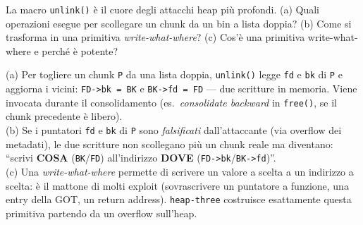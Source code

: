 \question[6]
La macro \lstinline|unlink()| è il cuore degli attacchi heap più profondi. (a) Quali operazioni esegue per scollegare un chunk da un bin a lista doppia? (b) Come si trasforma in una primitiva \emph{write-what-where}? (c) Cos'è una primitiva write-what-where e perché è potente?
\begin{solution}
(a) Per togliere un chunk \lstinline|P| da una lista doppia, \lstinline|unlink()| legge \lstinline|fd| e \lstinline|bk| di \lstinline|P| e aggiorna i vicini: \lstinline|FD->bk = BK| e \lstinline|BK->fd = FD| --- due scritture in memoria. Viene invocata durante il consolidamento (es.\ \emph{consolidate backward} in \lstinline|free()|, se il chunk precedente è libero).\\
(b) Se i puntatori \lstinline|fd| e \lstinline|bk| di \lstinline|P| sono \emph{falsificati} dall'attaccante (via overflow dei metadati), le due scritture non scollegano più un chunk reale ma diventano: ``scrivi \textbf{COSA} (\lstinline|BK|/\lstinline|FD|) all'indirizzo \textbf{DOVE} (\lstinline|FD->bk|/\lstinline|BK->fd|)''.\\
(c) Una \emph{write-what-where} permette di scrivere un valore a scelta a un indirizzo a scelta: è il mattone di molti exploit (sovrascrivere un puntatore a funzione, una entry della GOT, un return address). \lstinline|heap-three| costruisce esattamente questa primitiva partendo da un overflow sull'heap.
\end{solution}
